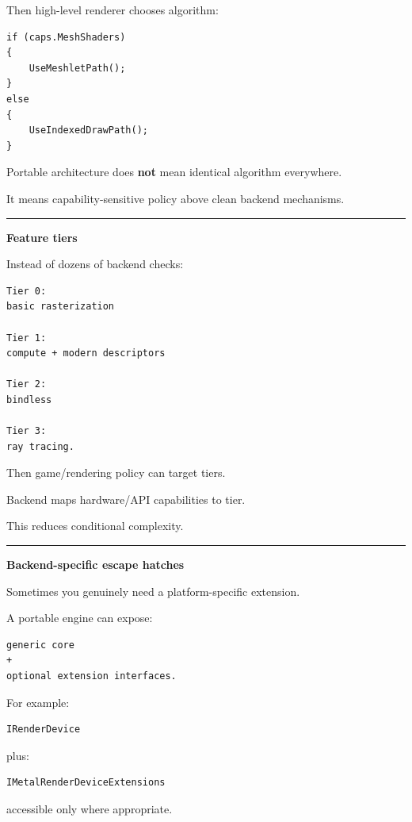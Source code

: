 Then high-level renderer chooses algorithm:

\begin{verbatim}
if (caps.MeshShaders)
{
    UseMeshletPath();
}
else
{
    UseIndexedDrawPath();
}
\end{verbatim}

Portable architecture does \textbf{not} mean identical algorithm everywhere.

It means capability-sensitive policy above clean backend mechanisms.

\begin{center}\rule{0.5\linewidth}{0.5pt}\end{center}

\textbf{Feature tiers}

Instead of dozens of backend checks:

\begin{verbatim}
Tier 0:
basic rasterization

Tier 1:
compute + modern descriptors

Tier 2:
bindless

Tier 3:
ray tracing.
\end{verbatim}

Then game/rendering policy can target tiers.

Backend maps hardware/API capabilities to tier.

This reduces conditional complexity.

\begin{center}\rule{0.5\linewidth}{0.5pt}\end{center}

\textbf{Backend-specific escape hatches}

Sometimes you genuinely need a platform-specific extension.

A portable engine can expose:

\begin{verbatim}
generic core
+
optional extension interfaces.
\end{verbatim}

For example:

\begin{verbatim}
IRenderDevice
\end{verbatim}

plus:

\begin{verbatim}
IMetalRenderDeviceExtensions
\end{verbatim}

accessible only where appropriate.

